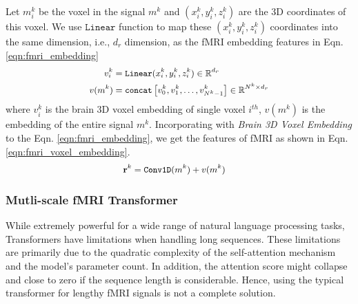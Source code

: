 Let $m_i^k$ be the voxel in the signal $m^k$ and $(x_i^k, y_i^k, z_i^k)$ are the 3D coordinates of this voxel. We use $\texttt{Linear}$ function to map these $(x_i^k, y_i^k, z_i^k)$ coordinates into the same dimension, i.e., $d_r$ dimension, as the fMRI embedding features in Eqn. \eqref{eqn:fmri_embedding} 
\begin{equation} \label{eqn:voxel_embedding}
\small
\begin{split}
    v_i^k &= \texttt{Linear}(x_i^k, y_i^k, z_i^k) \in \mathbb{R}^{d_r} \\
    v(m^k) &= \texttt{concat}\left[v_0^k, v_1^k, \dots, v_{N^k-1}^k\right] \in \mathbb{R}^{N^k \times d_r}
\end{split}
\end{equation}
where $v_i^k$ is the brain 3D voxel embedding of single voxel $i^{th}$, $v(m^k)$ is the embedding of the entire signal $m^k$.
Incorporating with \textit{Brain 3D Voxel Embedding} to the Eqn. \eqref{eqn:fmri_embedding}, we get the features of fMRI as shown in Eqn. \eqref{eqn:fmri_voxel_embedding}. 
\begin{equation} \label{eqn:fmri_voxel_embedding}
\small
\begin{split}
    \mathbf{r}^k &= \texttt{Conv1D}(m^k) + v(m^k)
\end{split}
\end{equation}
\subsubsection{Mutli-scale fMRI Transformer}

\label{sec:sht}


While extremely powerful for a wide range of natural language processing tasks, Transformers have limitations when handling long sequences. These limitations are primarily due to the quadratic complexity of the self-attention mechanism and the model's parameter count. In addition, the attention score might collapse and close to zero if the sequence length is considerable. 
Hence, using the typical transformer for lengthy fMRI signals 
is not a complete solution. 

